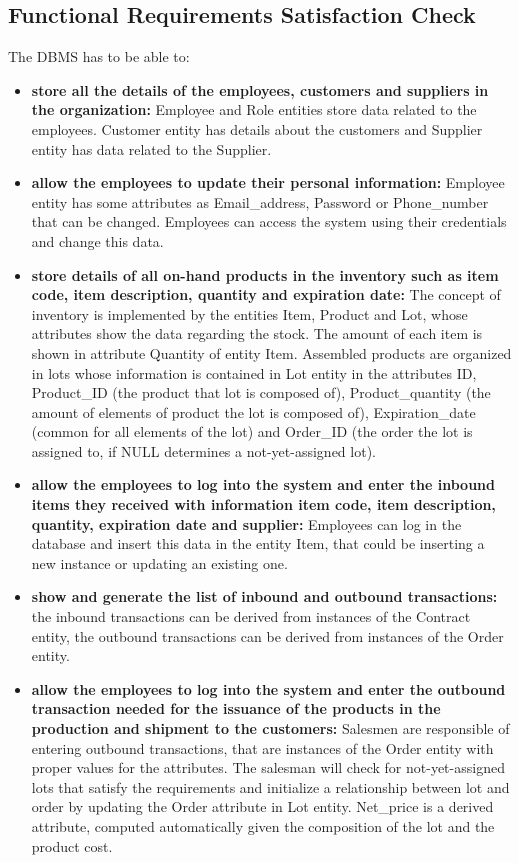 \subsection{Functional Requirements Satisfaction Check}

The DBMS has to be able to:
\begin{itemize}
	\item \textbf{store all the details of the employees, customers and suppliers in the organization:} Employee and Role entities store data related to the employees. Customer entity has details about the customers and Supplier entity has data related to the Supplier.
	\item \textbf{allow the employees to update their personal information:} Employee entity has some attributes as Email\_address, Password or Phone\_number that can be changed. Employees can access the system using their credentials and change this data.
	\item \textbf{store details of all on-hand products in the inventory such as item code, item description, quantity and expiration date:} The concept of inventory is implemented by the entities Item, Product and Lot, whose attributes show the data regarding the stock. The amount of each item is shown in attribute Quantity of entity Item. Assembled products are organized in lots whose information is contained in Lot entity in the attributes ID, Product\_ID (the product that lot is composed of), Product\_quantity (the amount of elements of product the lot is composed of), Expiration\_date (common for all elements of the lot) and Order\_ID (the order the lot is assigned to, if NULL determines a not-yet-assigned lot).  
	\item \textbf{allow the employees to log into the system and enter the inbound items they received with information item code, item description, quantity, expiration date and supplier:} Employees can log in the database and insert this data in the entity Item, that could be inserting a new instance or updating an existing one.
	\item \textbf{show and generate the list of inbound and outbound transactions:} the inbound transactions can be derived from instances of the Contract entity, the outbound transactions can be derived from instances of the Order entity.
	\item \textbf{allow the employees to log into the system and enter the outbound transaction needed for the issuance of the products in the production and shipment to the customers:} Salesmen are responsible of entering outbound transactions, that are instances of the Order entity with proper values for the attributes. The salesman will check for not-yet-assigned lots that satisfy the requirements and initialize a relationship between lot and order by updating the Order attribute in Lot entity. Net\_price is a derived attribute, computed automatically given the composition of the lot and the product cost.

\end{itemize}
